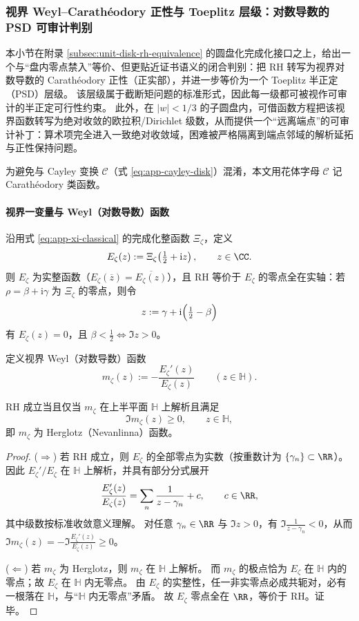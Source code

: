 \subsubsection{视界 Weyl--Carath\'eodory 正性与 Toeplitz 层级：对数导数的 PSD 可审计判别}\label{subsubsec:app-horizon-weyl-carath-toeplitz}
本小节在附录 \ref{subsec:unit-disk-rh-equivalence} 的圆盘化完成化接口之上，给出一个与“盘内零点禁入”等价、但更贴近证书语义的闭合判别：把 RH 转写为视界对数导数的 Carath\'eodory 正性（正实部），并进一步等价为一个 Toeplitz 半正定（PSD）层级。
该层级属于截断矩问题的标准形式，因此每一级都可被视作可审计的半正定可行性约束。
此外，在 \(|w|<1/3\) 的子圆盘内，可借函数方程把该视界函数转写为绝对收敛的欧拉积/Dirichlet 级数，从而提供一个“远离端点”的可审计补丁：算术项完全进入一致绝对收敛域，困难被严格隔离到端点邻域的解析延拓与正性保持问题。
\par
为避免与 Cayley 变换 \(\mathcal{C}\)（式 \eqref{eq:app-cayley-disk}）混淆，本文用花体字母 \(\mathscr{C}\) 记 Carath\'eodory 类函数。

\paragraph{视界一变量与 Weyl（对数导数）函数}
沿用式 \eqref{eq:app-xi-classical} 的完成化整函数 \(\Xi_{\zeta}\)，定义
\[
E_{\zeta}(z):=\Xi_{\zeta}\!\left(\tfrac12+\mathrm{i}z\right),\qquad z\in\CC .
\]
则 \(E_{\zeta}\) 为实整函数（\(E_{\zeta}(\overline z)=\overline{E_{\zeta}(z)}\)），且 RH 等价于 \(E_{\zeta}\) 的零点全在实轴：若 \(\rho=\beta+\mathrm{i}\gamma\) 为 \(\Xi_{\zeta}\) 的零点，则令
\[
z:=\gamma+\mathrm{i}\Bigl(\tfrac12-\beta\Bigr)
\]
有 \(E_{\zeta}(z)=0\)，且 \(\beta<\tfrac12 \iff \Im z>0\)。

定义视界 Weyl（对数导数）函数
\[
m_{\zeta}(z):=-\frac{E_{\zeta}'(z)}{E_{\zeta}(z)}\qquad(z\in\mathbb{H}).
\]

\begin{theorem}\label{thm:app-horizon-weyl-herglotz}
RH 成立当且仅当 \(m_{\zeta}\) 在上半平面 \(\mathbb{H}\) 上解析且满足
\[
\Im m_{\zeta}(z)\ge 0,\qquad z\in\mathbb{H},
\]
即 \(m_{\zeta}\) 为 Herglotz（Nevanlinna）函数。
\end{theorem}

\begin{proof}
(\(\Rightarrow\)) 若 RH 成立，则 \(E_{\zeta}\) 的全部零点为实数（按重数计为 \(\{\gamma_n\}\subset\RR\)）。
因此 \(E_{\zeta}'/E_{\zeta}\) 在 \(\mathbb{H}\) 上解析，并具有部分分式展开
\[
\frac{E_{\zeta}'(z)}{E_{\zeta}(z)}=\sum_n\frac{1}{z-\gamma_n}+c,
\qquad c\in\RR,
\]
其中级数按标准收敛意义理解。
对任意 \(\gamma_n\in\RR\) 与 \(\Im z>0\)，有 \(\Im\frac{1}{z-\gamma_n}<0\)，从而
\(\Im m_{\zeta}(z)=-\Im\frac{E_{\zeta}'(z)}{E_{\zeta}(z)}\ge 0\)。
\par
(\(\Leftarrow\)) 若 \(m_{\zeta}\) 为 Herglotz，则 \(m_{\zeta}\) 在 \(\mathbb{H}\) 上解析。
而 \(m_{\zeta}\) 的极点恰为 \(E_{\zeta}\) 在 \(\mathbb{H}\) 内的零点；故 \(E_{\zeta}\) 在 \(\mathbb{H}\) 内无零点。
由 \(E_{\zeta}\) 的实整性，任一非实零点必成共轭对，必有一根落在 \(\mathbb{H}\)，与“\(\mathbb{H}\) 内无零点”矛盾。
故 \(E_{\zeta}\) 零点全在 \(\RR\)，等价于 RH。证毕。
\end{proof}

